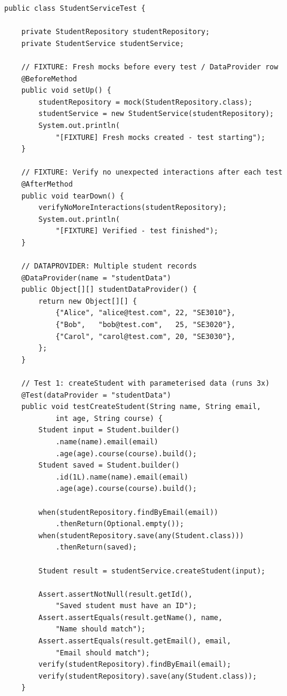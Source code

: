 \documentclass[12pt,a4paper]{article}
\begin{document}
\begin{lstlisting}[style=javastyle, caption={\texttt{StudentServiceTest.java} -- Member 2's fixture and mocking tests}]
public class StudentServiceTest {

    private StudentRepository studentRepository;
    private StudentService studentService;

    // FIXTURE: Fresh mocks before every test / DataProvider row
    @BeforeMethod
    public void setUp() {
        studentRepository = mock(StudentRepository.class);
        studentService = new StudentService(studentRepository);
        System.out.println(
            "[FIXTURE] Fresh mocks created - test starting");
    }

    // FIXTURE: Verify no unexpected interactions after each test
    @AfterMethod
    public void tearDown() {
        verifyNoMoreInteractions(studentRepository);
        System.out.println(
            "[FIXTURE] Verified - test finished");
    }

    // DATAPROVIDER: Multiple student records
    @DataProvider(name = "studentData")
    public Object[][] studentDataProvider() {
        return new Object[][] {
            {"Alice", "alice@test.com", 22, "SE3010"},
            {"Bob",   "bob@test.com",   25, "SE3020"},
            {"Carol", "carol@test.com", 20, "SE3030"},
        };
    }

    // Test 1: createStudent with parameterised data (runs 3x)
    @Test(dataProvider = "studentData")
    public void testCreateStudent(String name, String email,
            int age, String course) {
        Student input = Student.builder()
            .name(name).email(email)
            .age(age).course(course).build();
        Student saved = Student.builder()
            .id(1L).name(name).email(email)
            .age(age).course(course).build();

        when(studentRepository.findByEmail(email))
            .thenReturn(Optional.empty());
        when(studentRepository.save(any(Student.class)))
            .thenReturn(saved);

        Student result = studentService.createStudent(input);

        Assert.assertNotNull(result.getId(),
            "Saved student must have an ID");
        Assert.assertEquals(result.getName(), name,
            "Name should match");
        Assert.assertEquals(result.getEmail(), email,
            "Email should match");
        verify(studentRepository).findByEmail(email);
        verify(studentRepository).save(any(Student.class));
    }


\end{lstlisting}
\end{document}
